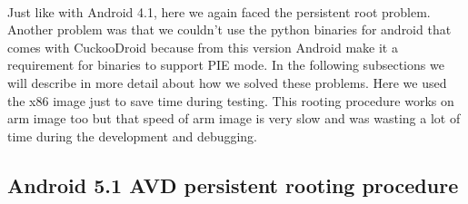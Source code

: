 \documentclass[../main.tex]{subfile}
\begin{document}
		\paragraph{} Just like with Android 4.1, here we again faced the persistent root problem. Another problem was that we couldn't use the python binaries for android that comes with CuckooDroid because from this version Android make it a requirement for binaries to support PIE mode. In the following subsections we will describe in more detail about how we solved these problems. Here we used the x86 image just to save time during testing. This rooting procedure works on arm image too but that speed of arm image is very slow and was wasting a lot of time during the development and debugging.
		
		\subsection{Android 5.1 AVD persistent rooting procedure} \label{sec:android_5.1_root}
\end{document}
